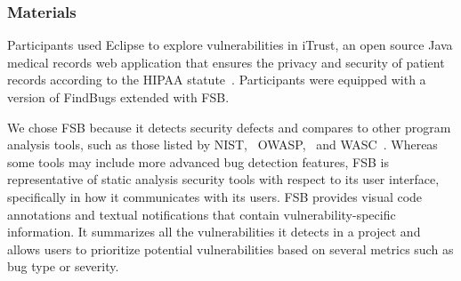 \documentclass{acm_proc_article-sp}
\begin{document}
\subsubsection{Materials}
Participants used Eclipse to explore vulnerabilities in iTrust, an open source Java medical records web application that ensures the privacy and security of patient records according to the HIPAA statute~\cite{HIPAA}. 
Participants were equipped with a version of FindBugs extended with FSB.

We chose FSB because it detects security defects and compares to other program analysis tools, such as those listed by NIST,~\cite{SecurityAnalyzers} OWASP,~\cite{OWASPSCA} and WASC~\cite{CodeAnalysis}. 
Whereas some tools may include more advanced bug detection features, FSB is representative of static analysis security tools with respect to its user interface, specifically in how it communicates with its users.
FSB provides visual code annotations and textual notifications that contain vulnerability-specific information.
It summarizes all the vulnerabilities it detects in a project and allows users to prioritize potential vulnerabilities based on several metrics such as bug type or severity.
\end{document}
